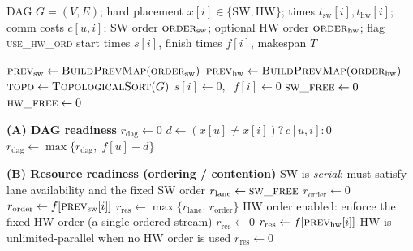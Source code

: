 \begin{algorithm}[!htbp]
\caption{HardSchedule--Order (Non-differentiable baseline for Diff-GNN with ordering)}
\label{alg:hard_order_clean}
\scriptsize
\begin{algorithmic}[1]
\Require DAG $G=(V,E)$; hard placement $x[i]\in\{\mathrm{SW},\mathrm{HW}\}$; times $t_{\mathrm{sw}}[i],t_{\mathrm{hw}}[i]$; comm costs $c[u,i]$;
SW order $\textsc{order}_{\mathrm{sw}}$; optional HW order $\textsc{order}_{\mathrm{hw}}$; flag \textsc{use\_hw\_ord}
\Ensure start times $s[i]$, finish times $f[i]$, makespan $T$

\State $\textsc{prev}_{\mathrm{sw}}\gets \textsc{BuildPrevMap}(\textsc{order}_{\mathrm{sw}})$
    \State $\textsc{prev}_{\mathrm{hw}}\gets \textsc{BuildPrevMap}(\textsc{order}_{\mathrm{hw}})$
\EndIf
\State $\textsc{topo}\gets\textsc{TopologicalSort}(G)$
 \State $s[i]\gets 0,\;\; f[i]\gets 0$ \EndFor
\State $\textsc{sw\_free}\gets 0$ 
\State $\textsc{hw\_free}\gets 0$ 


    \Statex \textbf{(A) DAG readiness}
    \State $r_{\mathrm{dag}}\gets 0$
        \State $d\gets (x[u]\neq x[i])?\,c[u,i]:0$
        \State $r_{\mathrm{dag}}\gets \max\{r_{\mathrm{dag}},\; f[u]+d\}$
    \EndFor

    \Statex \textbf{(B) Resource readiness (ordering / contention)}
        \Statex \quad SW is \emph{serial}: must satisfy lane availability and the fixed SW order
        \State $r_{\mathrm{lane}}\gets \textsc{sw\_free}$
        \State $r_{\mathrm{order}}\gets 0$
            \State $r_{\mathrm{order}}\gets f[\textsc{prev}_{\mathrm{sw}}[i]]$
        \EndIf
        \State $r_{\mathrm{res}}\gets \max\{r_{\mathrm{lane}},\, r_{\mathrm{order}}\}$
    \Else {}
            \Statex \quad HW order enabled: enforce the fixed HW order (a single ordered stream)
            \State $r_{\mathrm{res}}\gets 0$
                \State $r_{\mathrm{res}}\gets f[\textsc{prev}_{\mathrm{hw}}[i]]$
            \EndIf
        \Else
            \Statex \quad HW is unlimited-parallel when no HW order is used
            \State $r_{\mathrm{res}}\gets 0$
        \EndIf
    \EndIf


\end{algorithmic}
\end{algorithm}
